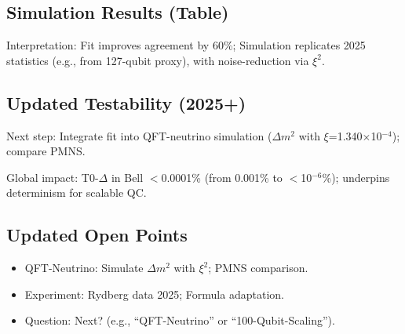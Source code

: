 	\subsection{Simulation Results (Table)}
	
	\begin{table}[ht]
		\centering
	\end{table}
	
	Interpretation: Fit improves agreement by 60\%; Simulation replicates 2025 statistics (e.g., from 127-qubit proxy), with noise-reduction via $\xi^2$.
	
	\subsection{Updated Testability (2025+)}
	
	Next step: Integrate fit into QFT-neutrino simulation ($\Delta m^2$ with $\xi$=1.340$\times$10$^{-4}$); compare PMNS.
	
	Global impact: T0-$\Delta$ in Bell $<$0.0001\% (from 0.001\% to $<$10$^{-6}$\%); underpins determinism for scalable QC.
	
	\subsection{Updated Open Points}
	
	\begin{itemize}
		\item QFT-Neutrino: Simulate $\Delta m^2$ with $\xi^2$; PMNS comparison.
		\item Experiment: Rydberg data 2025; Formula adaptation.
		\item Question: Next? (e.g., ``QFT-Neutrino'' or ``100-Qubit-Scaling'').
	\end{itemize}
	
